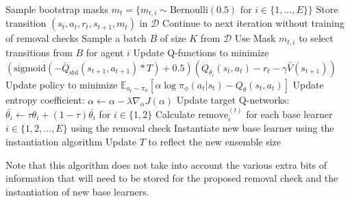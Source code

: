 \begin{algorithm}
\begin{algorithmic}[1]
        \State Sample bootstrap masks $m_{t} = \{m_{t,i} \sim \text{Bernoulli}(0.5) \text{ for } i \in \{1,..., E\}\}$
        \State Store transition $(s_{t}, a_{t}, r_{t}, s_{t+1}, m_t)$ in $\mathcal{D}$
    \EndFor
        \State Continue to next iteration without training of removal checks
    \EndIf
        \State Sample a batch $B$ of size $K$ from $\mathcal{D}$
            \State Use Mask $m_{t,i}$ to select transitions from $B$ for agent $i$
            \State Update Q-functions to minimize $(\text{sigmoid}(-\bar{Q}_{\text{std}}(s_{t+1}, a_{t+1})*T)+0.5)(Q_{\theta_i}(s_t, a_t)-r_t-\gamma \bar{V}(s_{t+1}))$
            \State Update policy to minimize $\mathbb{E}_{a_t \sim \pi_\phi}\left[ \alpha \log \pi_\phi (a_t|s_t) - Q_\theta(s_t, a_t)\right]$
            \State Update entropy coefficient: $\alpha \gets \alpha - \lambda \hat{\nabla}_{\alpha} J(\alpha)$
            \State Update target Q-networks: $\bar{\theta_{i}} \gets \tau\theta_{i} + (1 - \tau) \bar{\theta_{i}}$ for $i \in \{1,2\}$
        \EndFor
    \EndFor
        \State Calculate $\text{remove}_i^{(t)}$ for each base learner $i \in \{1,2,\ldots,E\}$ using the removal check
            \State Instantiate new base learner using the instantiation algorithm
            \State Update $T$ to reflect the new ensemble size
        \EndFor
    \EndIf
{}

\end{algorithmic}
\end{algorithm}

Note that this algorithm does not take into account the various extra bits of information that will need to be stored for the proposed removal check and the instantiation of new base learners.
